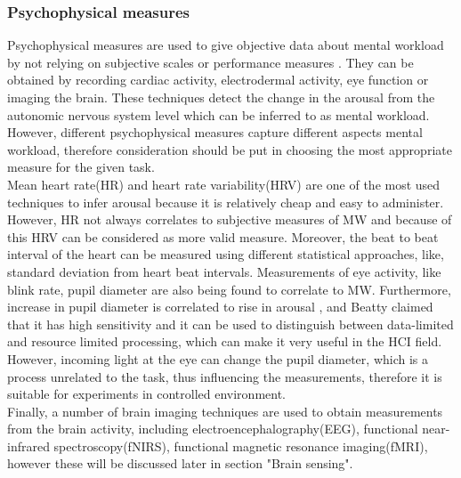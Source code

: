 \documentclass[a4paper]{report}
\begin{document}
				\subsubsection{Psychophysical measures}
				Psychophysical measures are used to give objective data about mental workload by not relying on subjective scales or performance measures . They can be obtained by recording cardiac activity, electrodermal activity, eye function or imaging the brain. These techniques detect the  change in the arousal from the autonomic nervous system level which can be inferred to as mental workload. However, different psychophysical measures capture different aspects mental workload\cite{cain2007review}, therefore consideration should be put in choosing the most appropriate measure for the given task. \\
				Mean heart rate(HR) and heart rate variability(HRV) are one of the most used techniques to infer arousal because it is relatively cheap and easy to administer. However, HR not always correlates to subjective measures of MW\cite{haapalainen2010psycho} and because of this HRV can be considered as more valid measure. Moreover, the beat to beat interval of the heart can be measured using different statistical approaches\cite{billman2011heart}, like, standard deviation from heart beat intervals. Measurements of eye activity, like blink rate, pupil diameter are also being found to correlate to MW. Furthermore, increase in pupil diameter is correlated to rise in arousal \cite{kahneman1973attention}, and Beatty claimed that it has high sensitivity \cite{beatty1982task} and it can be used to distinguish between data-limited and resource limited processing, which can make it very useful in the HCI field. However, incoming light at the eye can change the pupil diameter, which is a process unrelated to the task, thus influencing the measurements, therefore it is suitable for experiments in controlled environment. \\Finally, a number of brain imaging techniques are used to obtain measurements from the brain activity, including electroencephalography(EEG), functional near-infrared spectroscopy(fNIRS), functional magnetic resonance imaging(fMRI), however these will be discussed later in section "Brain sensing".
		
		
\end{document}
